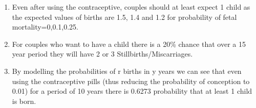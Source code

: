 \documentclass{article}
\begin{document}
\begin{enumerate}
\item Even after using the contraceptive, couples should at least expect 1 child as the expected values of births are 1.5, 1.4 and 1.2 for probability of fetal mortality=0,0.1,0.25.
\item For couples who want to have a child there is a 20\% chance that over a 15 year period they will have 2 or 3 Stillbirths/Miscarriages.
\item By modelling the probabilities of r births in y years we can see that even using the contraceptive pills (thus reducing the probability of conception to 0.01) for a period of 10 years there is 0.6273 probability that at least 1 child is born.
\end{enumerate} 




\end{document}
